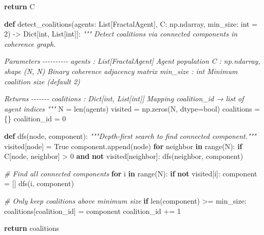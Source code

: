 \documentclass[
]{article}
\newenvironment{Shaded}{}{}
\newcommand{\BuiltInTok}[1]{\textcolor[rgb]{0.00,0.50,0.00}{#1}}
\newcommand{\CommentTok}[1]{\textcolor[rgb]{0.38,0.63,0.69}{\textit{#1}}}
\newcommand{\ControlFlowTok}[1]{\textcolor[rgb]{0.00,0.44,0.13}{\textbf{#1}}}
\newcommand{\DecValTok}[1]{\textcolor[rgb]{0.25,0.63,0.44}{#1}}
\newcommand{\KeywordTok}[1]{\textcolor[rgb]{0.00,0.44,0.13}{\textbf{#1}}}
\newcommand{\NormalTok}[1]{#1}
\newcommand{\OperatorTok}[1]{\textcolor[rgb]{0.40,0.40,0.40}{#1}}
\newcommand{\VariableTok}[1]{\textcolor[rgb]{0.10,0.09,0.49}{#1}}
\begin{document}
\begin{Shaded}
\begin{Highlighting}[]
    \ControlFlowTok{return}\NormalTok{ C}


\KeywordTok{def}\NormalTok{ detect\_coalitions(agents: List[FractalAgent],}
\NormalTok{                     C: np.ndarray,}
\NormalTok{                     min\_size: }\BuiltInTok{int} \OperatorTok{=} \DecValTok{2}\NormalTok{) }\OperatorTok{{-}\textgreater{}}\NormalTok{ Dict[}\BuiltInTok{int}\NormalTok{, List[}\BuiltInTok{int}\NormalTok{]]:}
    \CommentTok{"""}
\CommentTok{    Detect coalitions via connected components in coherence graph.}

\CommentTok{    Parameters}
\CommentTok{    {-}{-}{-}{-}{-}{-}{-}{-}{-}{-}}
\CommentTok{    agents : List[FractalAgent]}
\CommentTok{        Agent population}
\CommentTok{    C : np.ndarray, shape (N, N)}
\CommentTok{        Binary coherence adjacency matrix}
\CommentTok{    min\_size : int}
\CommentTok{        Minimum coalition size (default 2)}

\CommentTok{    Returns}
\CommentTok{    {-}{-}{-}{-}{-}{-}{-}}
\CommentTok{    coalitions : Dict[int, List[int]]}
\CommentTok{        Mapping coalition\_id → list of agent indices}
\CommentTok{    """}
\NormalTok{    N }\OperatorTok{=} \BuiltInTok{len}\NormalTok{(agents)}
\NormalTok{    visited }\OperatorTok{=}\NormalTok{ np.zeros(N, dtype}\OperatorTok{=}\BuiltInTok{bool}\NormalTok{)}
\NormalTok{    coalitions }\OperatorTok{=}\NormalTok{ \{\}}
\NormalTok{    coalition\_id }\OperatorTok{=} \DecValTok{0}

    \KeywordTok{def}\NormalTok{ dfs(node, component):}
        \CommentTok{"""Depth{-}first search to find connected component."""}
\NormalTok{        visited[node] }\OperatorTok{=} \VariableTok{True}
\NormalTok{        component.append(node)}
        \ControlFlowTok{for}\NormalTok{ neighbor }\KeywordTok{in} \BuiltInTok{range}\NormalTok{(N):}
            \ControlFlowTok{if}\NormalTok{ C[node, neighbor] }\OperatorTok{\textgreater{}} \DecValTok{0} \KeywordTok{and} \KeywordTok{not}\NormalTok{ visited[neighbor]:}
\NormalTok{                dfs(neighbor, component)}

    \CommentTok{\# Find all connected components}
    \ControlFlowTok{for}\NormalTok{ i }\KeywordTok{in} \BuiltInTok{range}\NormalTok{(N):}
        \ControlFlowTok{if} \KeywordTok{not}\NormalTok{ visited[i]:}
\NormalTok{            component }\OperatorTok{=}\NormalTok{ []}
\NormalTok{            dfs(i, component)}

            \CommentTok{\# Only keep coalitions above minimum size}
            \ControlFlowTok{if} \BuiltInTok{len}\NormalTok{(component) }\OperatorTok{\textgreater{}=}\NormalTok{ min\_size:}
\NormalTok{                coalitions[coalition\_id] }\OperatorTok{=}\NormalTok{ component}
\NormalTok{                coalition\_id }\OperatorTok{+=} \DecValTok{1}

    \ControlFlowTok{return}\NormalTok{ coalitions}
\end{Highlighting}
\end{Shaded}
\end{document}
